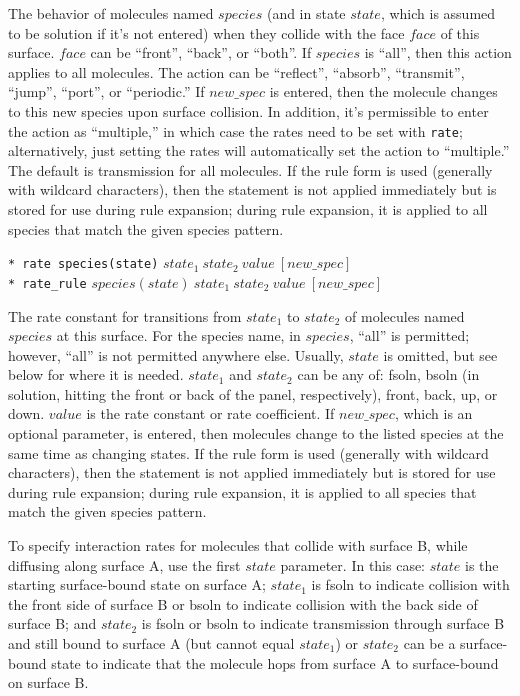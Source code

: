 \documentclass {book}
\newcommand {\ttt} {\texttt}
\begin{document}
\begin{description}
The behavior of molecules named $species$ (and in state $state$, which is assumed to be solution if it's not entered) when they collide with the face $face$ of this surface. $face$ can be ``front'', ``back'', or ``both''. If $species$ is ``all'', then this action applies to all molecules. The action can be ``reflect'', ``absorb'', ``transmit'', ``jump'', ``port'', or ``periodic.'' If $new\_spec$ is entered, then the molecule changes to this new species upon surface collision. In addition, it's permissible to enter the action as ``multiple,'' in which case the rates need to be set with \ttt{rate}; alternatively, just setting the rates will automatically set the action to ``multiple.'' The default is transmission for all molecules. If the rule form is used (generally with wildcard characters), then the statement is not applied immediately but is stored for use during rule expansion; during rule expansion, it is applied to all species that match the given species pattern.

\item{\ttt{* rate species(state)} $state_1\ state_2\ value\ [new\_spec]$\\
\ttt{* rate\_rule} $species(state)\ state_1\ state_2\ value\ [new\_spec]$}

The rate constant for transitions from $state_1$ to $state_2$ of molecules named $species$ at this surface. For the species name, in $species$, ``all'' is permitted; however, ``all'' is not permitted anywhere else. Usually, $state$ is omitted, but see below for where it is needed. $state_1$ and $state_2$ can be any of: fsoln, bsoln (in solution, hitting the front or back of the panel, respectively), front, back, up, or down. $value$ is the rate constant or rate coefficient. If $new\_spec$, which is an optional parameter, is entered, then molecules change to the listed species at the same time as changing states. If the rule form is used (generally with wildcard characters), then the statement is not applied immediately but is stored for use during rule expansion; during rule expansion, it is applied to all species that match the given species pattern.

To specify interaction rates for molecules that collide with surface B, while diffusing along surface A, use the first $state$ parameter. In this case: $state$ is the starting surface-bound state on surface A; $state_1$ is fsoln to indicate collision with the front side of surface B or bsoln to indicate collision with the back side of surface B; and $state_2$ is fsoln or bsoln to indicate transmission through surface B and still bound to surface A (but cannot equal $state_1$) or $state_2$ can be a surface-bound state to indicate that the molecule hops from surface A to surface-bound on surface B.


\end{description}
\end{document}
